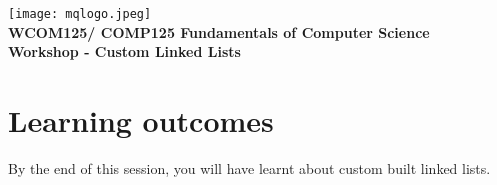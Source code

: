 \usepackage[T1]{fontenc}
\usepackage{pslatex}
\usepackage[pdftex]{color}  
\usepackage[pdftex]{graphicx}     
\usepackage{verbatim}
\usepackage{xcolor}
\usepackage{paralist}
\usepackage[colorlinks=true,urlcolor=red]{hyperref}


\usetikzlibrary{arrows.meta}
\usetikzlibrary{arrows,shapes,snakes,automata,backgrounds,petri}
\newcommand*\circled[1]{\tikz[baseline=(char.base)]{
            \node[shape=circle,draw,inner sep=2pt] (char) {#1};}}
            
\setlength{\topmargin}{-0.5in}                  %
\setlength{\textheight}{9.5in}                  %
\setlength{\oddsidemargin}{0in}                 %
\setlength{\evensidemargin}{0in}                %
\setlength{\textwidth}{6.5in}                   %
\setlength{\parindent}{0.0in}
\newcommand{\code}{\texttt}




%
\vspace{0.2in}
\begin{center}
        {\large  %
\texttt{[image: mqlogo.jpeg]}\\
\medskip
         {\bf WCOM125/ COMP125 Fundamentals of Computer Science\\
        Workshop - Custom Linked Lists\\}}
\end{center}
\vspace{0.3in}
%

\renewcommand{\labelenumi}{\alph{enumi}.}
 
\section* {Learning outcomes}

By the end of this session, you will have learnt about custom built linked lists. 


